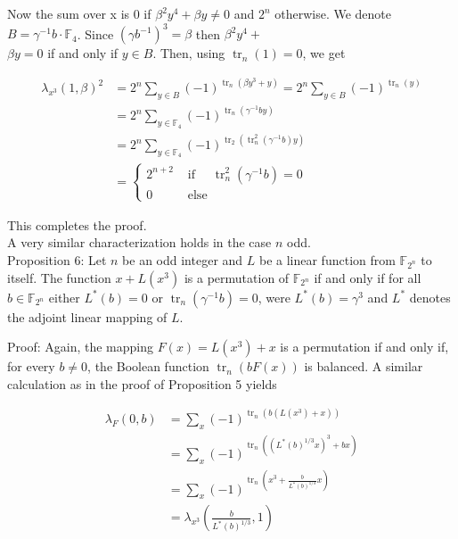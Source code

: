 \documentclass[10pt]{article}
\begin{document}
Now the sum over x is 0 if $\beta^{2} y^{4}+\beta y \neq 0$ and $2^{n}$ otherwise. We denote $B=\gamma^{-1} b \cdot \mathbb{F}_{4}$. Since $\left(\gamma b^{-1}\right)^{3}=\beta$ then $\beta^{2} y^{4}+$\\
$\beta y=0$ if and only if $y \in B$. Then, using $\operatorname{tr}_{n}(1)=0$, we get

$$
\begin{aligned}
\lambda_{x^{3}}(1, \beta)^{2} & =2^{n} \sum_{y \in B}(-1)^{\operatorname{tr}_{n}\left(\beta y^{3}+y\right)}=2^{n} \sum_{y \in B}(-1)^{\operatorname{tr}_{n}(y)} \\
& =2^{n} \sum_{y \in \mathbb{F}_{4}}(-1)^{\operatorname{tr}_{n}\left(\gamma^{-1} b y\right)} \\
& =2^{n} \sum_{y \in \mathbb{F}_{4}}(-1)^{\operatorname{tr}_{2}\left(\operatorname{tr}_{n}^{2}\left(\gamma^{-1} b\right) y\right)} \\
& =\left\{\begin{array}{cc}
2^{n+2} & \text { if } \quad \operatorname{tr}_{n}^{2}\left(\gamma^{-1} b\right)=0 \\
0 & \text { else }
\end{array}\right.
\end{aligned}
$$

This completes the proof.\\
A very similar characterization holds in the case $n$ odd.\\
Proposition 6: Let $n$ be an odd integer and $L$ be a linear function from $\mathbb{F}_{2^{n}}$ to itself. The function $x+L\left(x^{3}\right)$ is a permutation of $\mathbb{F}_{2^{n}}$ if and only if for all $b \in \mathbb{F}_{2^{n}}$ either $L^{*}(b)=0$ or $\operatorname{tr}_{n}\left(\gamma^{-1} b\right)=0$, were $L^{*}(b)=\gamma^{3}$ and $L^{*}$ denotes the adjoint linear mapping of $L$.

Proof: Again, the mapping $F(x)=L\left(x^{3}\right)+x$ is a permutation if and only if, for every $b \neq 0$, the Boolean function $\operatorname{tr}_{n}(b F(x))$ is balanced. A similar calculation as in the proof of Proposition 5 yields

$$
\begin{aligned}
\lambda_{F}(0, b) & =\sum_{x}(-1)^{\operatorname{tr}_{n}\left(b\left(L\left(x^{3}\right)+x\right)\right)} \\
& =\sum_{x}(-1)^{\operatorname{tr}_{n}\left(\left(L^{*}(b)^{1 / 3} x\right)^{3}+b x\right)} \\
& =\sum_{x}(-1)^{\operatorname{tr}_{n}\left(x^{3}+\frac{b}{L^{*}(b)^{1 / 3}} x\right)} \\
& =\lambda_{x^{3}}\left(\frac{b}{L^{*}(b)^{1 / 3}}, 1\right)
\end{aligned}
$$
\end{document}
